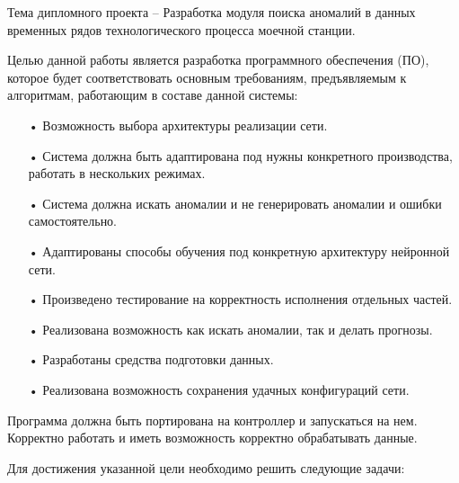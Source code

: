 {\gostFont
	
	\par \redline Тема дипломного проекта – Разработка модуля поиска аномалий в данных временных рядов технологического процесса моечной станции.
	\par \redline Целью данной работы является разработка программного обеспечения (ПО), которое будет соответствовать основным требованиям, предъявляемым к алгоритмам, работающим в составе данной системы:
	
	\begin{itemize}[leftmargin=2.15cm, labelwidth=0.65cm, labelsep=0.0cm] 
		
		\item[• ] Возможность выбора архитектуры реализации сети.		
		\addtocounter{itemcntr}{1}
				
		\item[• ] Система должна быть адаптирована под нужны конкретного производства, работать в нескольких режимах.		
		\addtocounter{itemcntr}{1}
		
		\item[• ] Система должна искать аномалии и не генерировать аномалии и ошибки самостоятельно. 		
		\addtocounter{itemcntr}{1}
		
		\item[• ] Адаптированы способы обучения под конкретную архитектуру нейронной сети.		
		\addtocounter{itemcntr}{1}
		
		\item[• ] Произведено тестирование на корректность исполнения отдельных частей.		
		\addtocounter{itemcntr}{1}
		
		\item[• ] Реализована возможность как искать аномалии, так и делать прогнозы.		
		\addtocounter{itemcntr}{1}
		
		\item[• ] Разработаны средства подготовки данных.		
		\addtocounter{itemcntr}{1}
		
		\item[• ] Реализована возможность сохранения удачных конфигураций сети.		
		\addtocounter{itemcntr}{1}
		
		\setcounter{itemcntr}{1}
	\end{itemize} 	
	
	\par \redline Программа должна быть портирована на контроллер и запускаться на нем. Корректно работать и иметь возможность корректно обрабатывать данные. 
	\par \redline Для достижения указанной цели необходимо решить следующие задачи:
	
}
